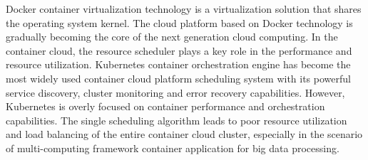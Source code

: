 \begin{eabstract}
Docker container virtualization technology is a virtualization solution that shares the operating system kernel. The cloud platform based on Docker technology is gradually becoming the core of the next generation cloud computing. In the container cloud, the resource scheduler plays a key role in the performance and resource utilization. Kubernetes container orchestration engine has become the most widely used container cloud platform scheduling system with its powerful service discovery, cluster monitoring and error recovery capabilities. However, Kubernetes is overly focused on container performance and orchestration capabilities. The single scheduling algorithm leads to poor resource utilization and load balancing of the entire container cloud cluster, especially in the scenario of multi-computing framework container application for big data processing.


\end{eabstract}
